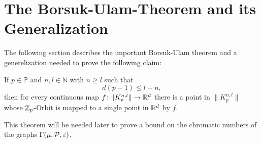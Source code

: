 \section{The Borsuk-Ulam-Theorem and its Generalization}

The following section describes the important Borsuk-Ulam theorem and a generelization needed to prove the following claim:
\begin{thm}
  If $p \in \mathbb{P}$ and $n, l \in \mathbb{N}$ with $n \geq l$ such that
  \begin{equation*}
    d(p-1) \leq l - n,
  \end{equation*}
  then for every continuous map $f\colon\lVert K_p^{n,l}\rVert \to \R^d$ there is a point in $\lVert K_p^{n,l}\rVert$ whose $\Z_p$-Orbit is mapped to a single point in $\R^d$ by $f$.
\end{thm}
This theorem will be needed later to prove a bound on the chromatic numbers of the graphs $\Gamma(\mu, \P, \varepsilon)$.
